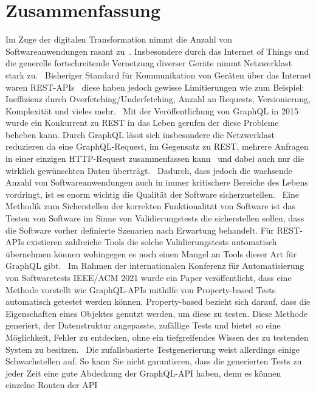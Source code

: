 \chapter{Zusammenfassung}

Im Zuge der digitalen Transformation nimmt die Anzahl von Softwareanwendungen rasant zu~\cite{digitale-transformation}.
Insbesondere durch das Internet of Things und die generelle fortschreitende Vernetzung diverser Geräte nimmt Netzwerklast stark zu.~\cite{iot-traffic}
Bisheriger Standard für Kommunikation von Geräten über das Internet waren REST-APIs~\cite[vgl. Introduction]{hygraph} diese haben jedoch gewisse
Limitierungen wie zum Beispiel: Ineffizienz durch Overfetching/Underfetching, Anzahl an Requests, Versionierung, Komplexität und vieles mehr.~\cite{hygraph}
Mit der Veröffentlichung von GraphQL in 2015 wurde ein Konkurrent zu REST in das Leben gerufen der diese Probleme beheben kann.
Durch GraphQL lässt sich insbesondere die Netzwerklast reduzieren da eine GraphQL-Request, im Gegensatz zu REST, mehrere Anfragen in einer
einzigen HTTP-Request zusammenfassen kann~\cite{awsrestgraphql} und dabei auch nur die wirklich gewünschten Daten überträgt.~\cite[vgl. Advantages of GraphQL APIs]{hygraph}
Dadurch, dass jedoch die wachsende Anzahl von Softwareanwendungen auch in immer kritischere Bereiche des Lebens vordringt, ist es
enorm wichtig die Qualität der Software sicherzustellen.~\cite[S. 16]{software-testing}
Eine Methodik zum Sicherstellen der korrekten Funktionalität von Software ist das Testen von Software im Sinne von Validierungstests die sicherstellen sollen,
dass die Software vorher definierte Szenarien nach Erwartung behandelt.
Für REST-APIs existieren zahlreiche Tools die solche Validierungstests automatisch übernehmen können wohingegen es noch einen Mangel
an Tools dieser Art für GraphQL gibt.~\cite[vgl. Introduction]{property-based-testing}
Im Rahmen der internationalen Konferenz für Automatisierung von Softwaretests IEEE/ACM 2021 wurde ein Paper veröffentlicht, dass eine Methode vorstellt wie GraphQL-APIs mithilfe von
Property-based Tests automatisch getestet werden können.
Property-based bezieht sich darauf, dass die Eigenschaften eines Objektes genutzt werden, um diese zu testen.
Diese Methode generiert, der Datenstruktur angepasste, zufällige Tests und bietet so eine Möglichkeit, Fehler zu entdecken, ohne ein tiefgreifendes Wissen
des zu testenden System zu besitzen.~\cite[vgl. Proposed Method]{property-based-testing}
Die zufallsbasierte Testgenerierung weist allerdings einige Schwachstellen auf.
So kann Sie nicht garantieren, dass die generierten Tests zu jeder Zeit eine gute Abdeckung der GraphQL-API haben, denn es können einzelne Routen der API
